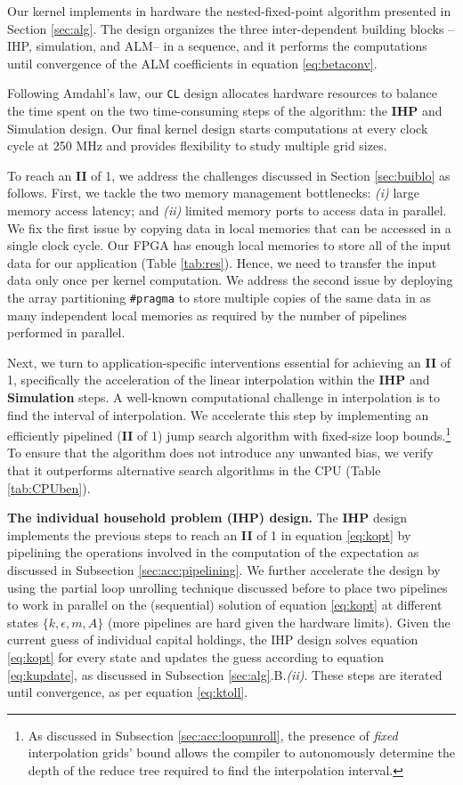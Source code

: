 \documentclass[12pt,american]{article}
\newcommand{\state}{k,\epsilon,m,A}
\begin{document}
Our kernel implements in hardware the nested-fixed-point algorithm presented in Section \ref{sec:alg}. The design organizes the three inter-dependent building blocks --IHP, simulation, and ALM-- in a sequence, and it performs the computations until convergence of the ALM coefficients in equation \eqref{eq:betaconv}.

Following Amdahl's law, our \texttt{CL} design allocates hardware resources to balance the time spent on the two time-consuming steps of the algorithm: the \textbf{IHP} and Simulation design. Our final kernel design starts computations at every clock cycle at 250 MHz and provides flexibility to study multiple grid sizes. 

To reach an \textbf{II} of 1, we address the challenges discussed in Section \ref{sec:buiblo} as follows. First, we tackle the two memory management bottlenecks: \textit{(i)} large memory access latency; and \textit{(ii)} limited memory ports to access data in parallel. We fix the first issue by copying data in local memories that can be accessed in a single clock cycle. Our FPGA has enough local memories to store all of the input data for our application (Table \ref{tab:res}). Hence, we need to transfer the input data only once per kernel computation. We address the second issue by deploying the array partitioning \texttt{\#pragma} to store multiple copies of the same data in as many independent local memories as required by the number of pipelines performed in parallel.

Next, we turn to application-specific interventions essential for achieving an \textbf{II} of 1, specifically the acceleration of the linear interpolation within the \textbf{IHP} and \textbf{Simulation} steps. A well-known computational challenge in interpolation is to find the interval of interpolation. We accelerate this step by implementing an efficiently pipelined (\textbf{II} of 1) jump search algorithm with fixed-size loop bounds.\footnote{As discussed in Subsection \ref{sec:acc:loopunroll}, the presence of \textit{fixed} interpolation grids' bound allows the compiler to autonomously determine the depth of the reduce tree required to find the interpolation interval.} To ensure that the algorithm does not introduce any unwanted bias, we verify that it outperforms alternative search algorithms in the CPU (Table \ref{tab:CPUben}).

\textbf{The individual household problem (IHP) design.} The \textbf{IHP} design implements the previous steps to reach an \textbf{II} of 1 in equation \eqref{eq:kopt} by pipelining the operations involved in the computation of the expectation as discussed in Subsection \ref{sec:acc:pipelining}. We further accelerate the design by using the partial loop unrolling technique discussed before to place two pipelines to work in parallel on the (sequential) solution of equation \eqref{eq:kopt} at different states $\{\state\}$ (more pipelines are hard given the hardware limits). Given the current guess of individual capital holdings, the IHP design solves equation \eqref{eq:kopt} for every state and updates the guess according to equation \eqref{eq:kupdate}, as discussed in Subsection \ref{sec:alg}.B.\textit{(ii)}. These steps are iterated until convergence, as per equation \eqref{eq:ktoll}. 
\end{document}
